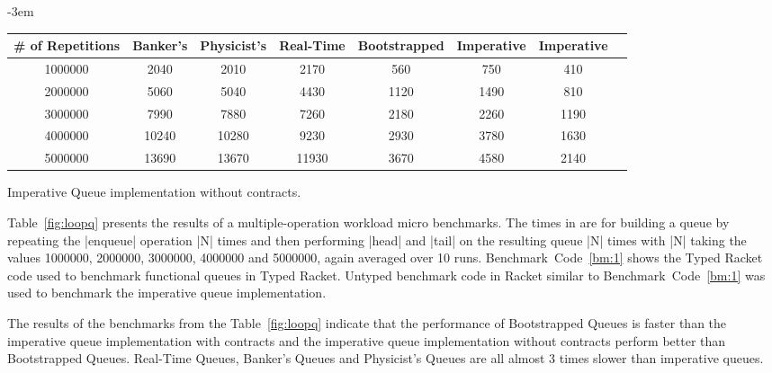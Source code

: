 \begin{figure*}
  \begin{adjustwidth}{-3em}{}
    \begin{threeparttable}
      \begin{tabular}{|c|c|c|c|c|c|c|c|}
        \hline
        \# of Repetitions & Banker's & Physicist's & Real-Time & Bootstrapped & Imperative & Imperative\tnote{$\ddagger$} \\
        \hline
        1000000 & 2040  & 2010  & 2170  & 560  & 750  & 410  \\
        \hline
        2000000 & 5060  & 5040  & 4430  & 1120 & 1490 & 810  \\
        \hline
        3000000 & 7990  & 7880  & 7260  & 2180 & 2260 & 1190 \\
        \hline
        4000000 & 10240 & 10280 & 9230  & 2930 & 3780 & 1630 \\
        \hline
        5000000 & 13690 & 13670 & 11930 & 3670 & 4580 & 2140 \\
        \hline
      \end{tabular}
      \begin{tablenotes}
      \item[$\ddagger$] Imperative Queue implementation without contracts.
      \end{tablenotes}
    \end{threeparttable} 
  \end{adjustwidth}
  \caption{Queue Performance: Multiple Operations}
  \label{fig:loopq}
\end{figure*}

Table~\ref{fig:loopq} presents the results of a multiple-operation
workload micro benchmarks. The times in are for building a queue by
repeating the \scheme|enqueue| operation \scheme|N| times and then
performing \scheme|head| and \scheme|tail| on the resulting queue
\scheme|N| times with \scheme|N| taking the values 1000000, 2000000,
3000000, 4000000 and 5000000, again averaged over 10
runs. Benchmark~Code~\ref{bm:1} shows the Typed Racket code used to
benchmark functional queues in Typed Racket. Untyped benchmark code in
Racket similar to Benchmark~Code~\ref{bm:1} was used to benchmark the
imperative queue implementation.


The results of the benchmarks from the Table~\ref{fig:loopq} indicate
that the performance of Bootstrapped Queues is faster than the
imperative queue implementation with contracts and the imperative queue
implementation without contracts perform better than Bootstrapped
Queues. Real-Time Queues, Banker's Queues and Physicist's Queues are all
almost 3 times slower than imperative queues.

